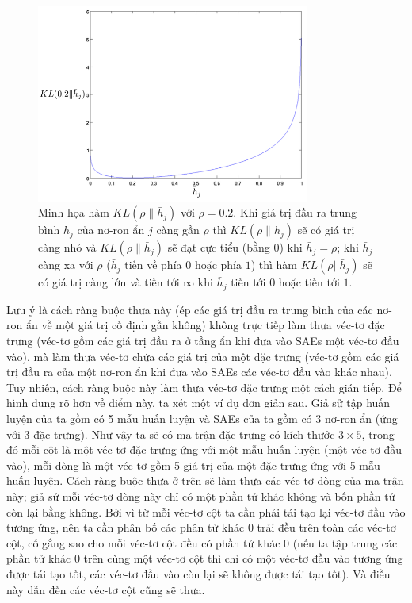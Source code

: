 \begin{figure}
	\centering
	\includegraphics[width=0.8\textwidth]{KL}
	\caption[Minh họa hàm $KL(\rho\|\bar{h}_j)$ với $\rho=0.2$]{Minh họa hàm $KL(\rho\|\bar{h}_j)$ với $\rho=0.2$. Khi giá trị đầu ra trung bình $\bar{h}_j$ của nơ-ron ẩn $j$ càng gần $\rho$ thì $KL(\rho\|\bar{h}_j)$ sẽ có giá trị càng nhỏ và $KL(\rho\|\bar{h}_j)$ sẽ đạt cực tiểu (bằng $0$) khi $\bar{h}_j = \rho$; khi $\bar{h}_j$ càng xa với $\rho$ ($\bar{h}_j$ tiến về phía $0$ hoặc phía $1$) thì hàm $KL(\rho||\bar{h}_j)$ sẽ có giá trị càng lớn và tiến tới $\infty$ khi $\bar{h}_j$ tiến tới $0$ hoặc tiến tới $1$.}
	\label{fig_KL}
\end{figure}

Lưu ý là cách ràng buộc thưa này (ép các giá trị đầu ra trung bình của các nơ-ron ẩn về một giá trị cố định gần không) không trực tiếp làm thưa véc-tơ đặc trưng (véc-tơ gồm các giá trị đầu ra ở tầng ẩn khi đưa vào SAEs một véc-tơ đầu vào), mà làm thưa véc-tơ chứa các giá trị của một đặc trưng (véc-tơ gồm các giá trị đầu ra của một nơ-ron ẩn khi đưa vào SAEs các véc-tơ đầu vào khác nhau). Tuy nhiên, cách ràng buộc này làm thưa véc-tơ đặc trưng một cách gián tiếp. Để hình dung rõ hơn về điểm này, ta xét một ví dụ đơn giản sau. Giả sử tập huấn luyện của ta gồm có 5 mẫu huấn luyện và SAEs của ta gồm có 3 nơ-ron ẩn (ứng với 3 đặc trưng). Như vậy ta sẽ có ma trận đặc trưng có kích thước $3\times 5$, trong đó mỗi cột là một véc-tơ đặc trưng ứng với một mẫu huấn luyện (một véc-tơ đầu vào), mỗi dòng là một véc-tơ gồm 5 giá trị của một đặc trưng ứng với 5 mẫu huấn luyện. Cách ràng buộc thưa ở trên sẽ làm thưa các véc-tơ dòng của ma trận này; giả sử mỗi véc-tơ dòng này chỉ có một phần tử khác không và bốn phần tử còn lại bằng không. Bởi vì từ mỗi véc-tơ cột ta cần phải tái tạo lại véc-tơ đầu vào tương ứng, nên ta cần phân bố các phân tử khác 0 trải đều trên toàn các véc-tơ cột, cố gắng sao cho mỗi véc-tơ cột đều có phần tử khác 0 (nếu ta tập trung các phần tử khác 0 trên cùng một véc-tơ cột thì chỉ có một véc-tơ đầu vào tương ứng được tái tạo tốt, các véc-tơ đầu vào còn lại sẽ không được tái tạo tốt). Và điều này dẫn đến các véc-tơ cột cũng sẽ thưa.

